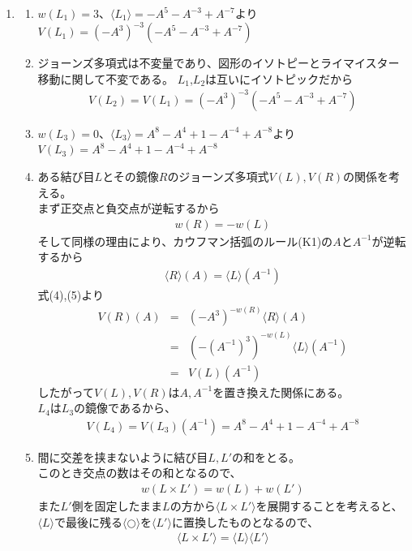 \documentclass{jsarticle}
\begin{document}
\begin{enumerate}
\item
\begin{enumerate}
\renewcommand{\labelenumii}{(\arabic{enumii})}
\item $ w(L_1) = 3 $、$ \langle L_1 \rangle = -A^5 - A^{-3} + A^{-7} $より$ V(L_1) = (-A^3)^{-3}(-A^5 - A^{-3} + A^{-7}) $
\item
ジョーンズ多項式は不変量であり、図形のイソトピーとライマイスター移動に関して不変である。
$L_1$,$L_2$は互いにイソトピックだから
\begin{eqnarray} V(L_2) = V(L_1) = (-A^3)^{-3}(-A^5 - A^{-3} + A^{-7}) \nonumber \end{eqnarray}
\item $ w(L_3) = 0 $、$ \langle L_3 \rangle = A^8 - A^4 + 1 - A^{-4} + A^{-8} $より$ V(L_3) = A^8 - A^4 + 1 - A^{-4} + A^{-8} $
\item
ある結び目$L$とその鏡像$R$のジョーンズ多項式$V(L),V(R)$の関係を考える。\\
まず正交点と負交点が逆転するから\begin{eqnarray} w(R) = - w(L) \end{eqnarray}
そして同様の理由により、カウフマン括弧のルール(K1)の$A$と$A^{-1}$が逆転するから\begin{eqnarray} \langle R \rangle (A) = \langle L \rangle (A^{-1}) \end{eqnarray}
式(4),(5)より
\begin{eqnarray}
V(R)(A) &=& (-A^3)^{-w(R)}\langle R \rangle (A) \nonumber \\
&=& (-(A^{-1})^3)^{-w(L)}\langle L \rangle (A^{-1}) \nonumber \\
&=& V(L)(A^{-1}) \nonumber
\end{eqnarray}
したがって$V(L),V(R)$は$A,A^{-1}$を置き換えた関係にある。\\
$L_4$は$L_3$の鏡像であるから、\begin{eqnarray} V(L_4) = V(L_3)(A^{-1}) = A^8 - A^4 + 1 - A^{-4} + A^{-8} \nonumber \end{eqnarray}
\item
間に交差を挟まないように結び目$L,L'$の和をとる。\\
このとき交点の数はその和となるので、\begin{eqnarray} w(L \times L') = w(L) + w(L') \end{eqnarray}
また$L'$側を固定したまま$L$の方から$\langle L \times L' \rangle$を展開することを考えると、$\langle L \rangle$で最後に残る$\langle \bigcirc \rangle$を$\langle L' \rangle$に置換したものとなるので、
\begin{eqnarray} \langle L \times L' \rangle = \langle L \rangle \langle L' \rangle \end{eqnarray}

\end{enumerate}
\end{enumerate}
\end{document}
